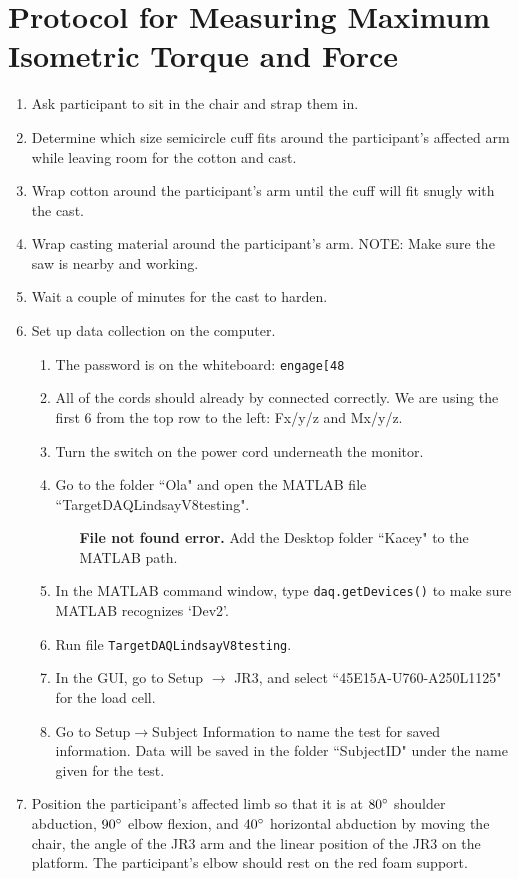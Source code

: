 \documentclass[11pt]{article}
\begin{document}
\section{Protocol for Measuring Maximum Isometric Torque and Force}
\begin{enumerate}

\item Ask participant to sit in the chair and strap them in.
\item Determine which size semicircle cuff fits around the participant’s affected arm while leaving room for the cotton and cast.
\item Wrap cotton around the participant’s arm until the cuff will fit snugly with the cast.
\item Wrap casting material around the participant’s arm. NOTE: Make sure the saw is nearby and working.
\item Wait a couple of minutes for the cast to harden.
\item Set up data collection on the computer. 
	\begin{enumerate}
	\item The password is on the whiteboard: \texttt{engage[48}
	\item All of the cords should already by connected correctly. We are using the first 6 from the top row to the left: Fx/y/z and Mx/y/z.
	\item Turn the switch on the power cord underneath the monitor. 
	\item Go to the folder ``Ola" and open the MATLAB file ``TargetDAQLindsayV8testing".
	\begin{enumerate}
	\item [\textbf{File not found error.}] Add the Desktop folder ``Kacey" to the MATLAB path.
    \end{enumerate}
	\item In the MATLAB command window, type \texttt{daq.getDevices()} to make sure MATLAB recognizes `Dev2'.
	\item Run file \texttt{TargetDAQLindsayV8testing}.
	\item In the GUI, go to Setup $\to$ JR3, and select ``45E15A-U760-A250L1125" for the load cell.
	\item Go to Setup$\to$Subject Information to name the test for saved information. Data will be saved in the folder ``SubjectID" under the name given for the test.
\end{enumerate}
\item Position the participant's affected limb so that it is at $80\degree$ shoulder abduction, $90\degree$ elbow flexion, and $40\degree$ horizontal abduction by moving the chair, the angle of the JR3 arm and the linear position of the JR3 on the platform. The participant’s elbow should rest on the red foam support.

\end{enumerate}
\end{document}
